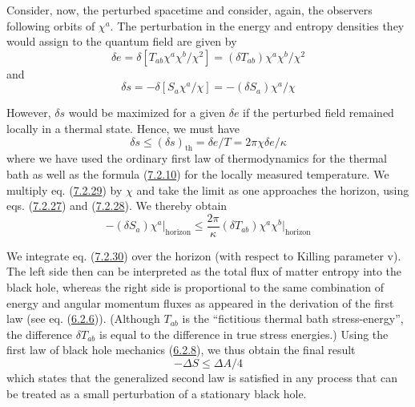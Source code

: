 \documentclass[11pt,a4paper]{article}
\begin{document}
\hypertarget{source-186}{}

Consider, now, the perturbed spacetime and consider, again, the observers following orbits of \(\chi^a\). The perturbation in the energy and entropy densities they would assign to the quantum field are given by
\begin{equation*}
\delta e=\delta[T_{ab}\chi^a\chi^b/\chi^2]=(\delta T_{ab})\chi^a\chi^b/\chi^2\tag{7.2.27}\label{eq:7.2.27}
\end{equation*}
and
\begin{equation*}
\delta s = -\delta[S_a \chi^a/\chi] = -(\delta S_a) \chi^a/\chi \tag{7.2.28}\label{eq:7.2.28}
\end{equation*}

However, \(\delta s\) would be maximized for a given \(\delta e\) if the perturbed field remained locally in a thermal state. Hence, we must have
\begin{equation*}
\delta s \le (\delta s)_{\mathrm{th}} = \delta e/T = 2\pi \chi \delta e/\kappa \tag{7.2.29}\label{eq:7.2.29}
\end{equation*}
where we have used the ordinary first law of thermodynamics for the thermal bath as well as the formula (\hyperref[eq:7.2.10]{7.2.10}) for the locally measured temperature. We multiply eq. (\hyperref[eq:7.2.29]{7.2.29}) by \(\chi\) and take the limit as one approaches the horizon, using eqs. (\hyperref[eq:7.2.27]{7.2.27}) and (\hyperref[eq:7.2.28]{7.2.28}). We thereby obtain
\begin{equation*}
-(\delta S_a) \chi^a \Big|_{\mathrm{horizon}} \le \frac{2\pi}{\kappa} (\delta T_{ab}) \chi^a \chi^b \Big|_{\mathrm{horizon}} \tag{7.2.30}\label{eq:7.2.30}
\end{equation*}

We integrate eq. (\hyperref[eq:7.2.30]{7.2.30}) over the horizon (with respect to Killing parameter v). The left side then can be interpreted as the total flux of matter entropy into the black hole, whereas the right side is proportional to the same combination of energy and angular momentum fluxes as appeared in the derivation of the first law (see eq. (\hyperref[eq:6.2.6]{6.2.6})). (Although \(T_{ab}\) is the ``fictitious thermal bath stress-energy'', the difference \(\delta T_{ab}\) is equal to the difference in true stress energies.) Using the first law of black hole mechanics (\hyperref[eq:6.2.8]{6.2.8}), we thus obtain the final result
\begin{equation*}
-\Delta S \le \Delta A/4 \tag{7.2.31}\label{eq:7.2.31}
\end{equation*}
which states that the generalized second law is satisfied in any process that can be treated as a small perturbation of a stationary black hole.
\end{document}
